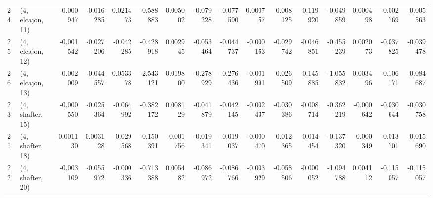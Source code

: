 \begin{tabular}{llrrrrrrrrrrrrrr}
24 &  (4, elcajon, 11) &  -0.000947 & -0.016285 &  0.021473 &  -0.588883 &  0.005002 &  -0.079228 & -0.077590 &  0.000757 & -0.008125 & -0.119920 &  -0.049859 &  0.000498 & -0.002769 & -0.005563 \\
25 &  (4, elcajon, 12) &  -0.001542 & -0.027206 & -0.042285 &  -0.428918 &  0.002945 &  -0.053464 & -0.044737 & -0.000163 & -0.029742 & -0.046851 &  -0.455239 &  0.002073 & -0.037825 & -0.039478 \\
26 &  (4, elcajon, 13) &  -0.002009 & -0.044557 &  0.053378 &  -2.543121 &  0.019800 &  -0.278929 & -0.276436 & -0.001991 & -0.026509 & -0.145885 &  -1.055832 &  0.003496 & -0.106171 & -0.084687 \\
23 &  (4, shafter, 15) &  -0.000550 & -0.025364 & -0.064992 &  -0.382172 &  0.008129 &  -0.041879 & -0.042145 & -0.002437 & -0.030386 & -0.008714 &  -0.362219 & -0.000642 & -0.030644 & -0.030758 \\
21 &  (4, shafter, 18) &   0.001130 &  0.003128 & -0.029568 &  -0.150391 & -0.001756 &  -0.019341 & -0.019037 & -0.000470 & -0.012365 & -0.014454 &  -0.137320 & -0.000349 & -0.013701 & -0.015690 \\
22 &  (4, shafter, 20) &  -0.003109 & -0.055972 & -0.000336 &  -0.713388 &  0.005482 &  -0.086972 & -0.086766 & -0.003929 & -0.058506 & -0.000052 &  -1.094788 &  0.004112 & -0.115057 & -0.115057 \\
\bottomrule
\end{tabular}

